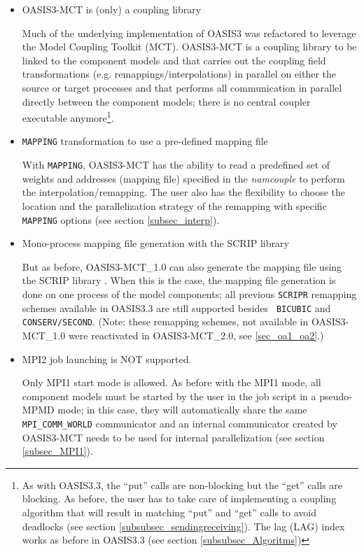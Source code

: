 \begin{itemize}
\item OASIS3-MCT is (only) a coupling library

Much of the underlying implementation of OASIS3 was refactored to
leverage the Model Coupling Toolkit (MCT). OASIS3-MCT is a coupling
library to be linked to the component models and that
carries out the coupling field transformations (e.g. remappings/interpolations)
in parallel on either the source or target processes and that performs
all communication in parallel directly between the component models; there
is no central coupler executable anymore\footnote{As with OASIS3.3,
  the ``put'' calls are non-blocking but the ``get'' calls are
blocking. As before, the user has to take care of implementing a coupling
algorithm that will result in matching ``put'' and ``get'' calls to
avoid deadlocks (see section \ref{subsubsec_sendingreceiving}). The lag (LAG) index works as
before in OASIS3.3 (see section \ref{subsubsec_Algoritms})}. 

\item {\tt MAPPING} transformation to use a pre-defined mapping file

With {\tt MAPPING}, OASIS3-MCT has the ability to read a predefined
set of weights and addresses (mapping file) specified in the {\it
  namcouple} to perform the interpolation/remapping. The user also has
the flexibility to choose the location and the parallelization strategy of the
remapping with specific {\tt MAPPING} options (see section \ref{subsec_interp}).

\item Mono-process mapping file generation with the SCRIP library

But as before, OASIS3-MCT\_1.0 can
also generate the mapping file using the SCRIP library
\citep{Jones99}. When this is the case, the mapping file generation is
done on one process of the model components; all previous {\tt SCRIPR} remapping
schemes available in OASIS3.3 are still supported besides {\tt
  BICUBIC} and {\tt CONSERV/SECOND}. (Note: these remapping schemes, not available in OASIS3-MCT\_1.0 were reactivated in OASIS3-MCT\_2.0, see \ref{sec_oa1_oa2}.)

\item MPI2 job launching is NOT supported. 

  Only MPI1 start mode is allowed. As before with the MPI1 mode, all
  component models must be started by the user in the job script in a
  pseudo-MPMD mode; in this case, they will automatically share the
  same {\tt MPI\_COMM\_WORLD} communicator and an internal
  communicator created by OASIS3-MCT needs to be used for internal
  parallelization (see section \ref{subsec_MPI1}).

\end{itemize}

